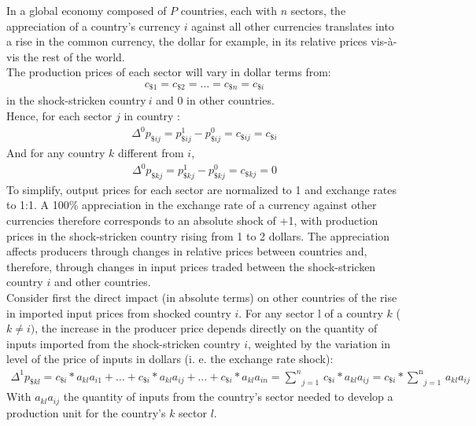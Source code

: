 \documentclass[11pt,a4paper]{article}
\begin{document}
In a global economy composed of $P$ countries, each with $n$ sectors, the appreciation of a country's currency $i$ against all other currencies translates into a rise in the common currency, the dollar for example, in its relative prices vis-\`a-vis the rest of the world. \\ 
The production prices of each sector will vary in dollar terms from:
\begin{eqnarray*}
c_{\$1}=c_{\$2}=\ldots=c_{\$n}=c_{\$i} 
  \end{eqnarray*}	
in the shock-stricken country$~i$ and 0 in other countries. \\
Hence, for each sector $j$ in country  :
\begin{eqnarray*}
 {{\Delta }^{0}}p_{\${ij}}=p_{\${ij}}^{1}-p_{\${ij}}^{0}=c_{\${ij}}=c_{\${i}}
  \end{eqnarray*}	
And for any country $k$ different from $i$,
\begin{eqnarray*}
 {{\Delta }^{0}}p_{\${kj}}=p_{\${kj}}^{1}-p_{\${kj}}^{0}=c_{\${kj}}=0
 \end{eqnarray*}	
To simplify, output prices for each sector are normalized to 1 and exchange rates to 1:1. A 100$\%$ appreciation in the exchange rate of a currency against other currencies therefore corresponds to an absolute shock of +1, with production prices in the shock-stricken country rising from 1 to 2 dollars. The appreciation affects producers through changes in relative prices between countries and, therefore, through changes in input prices traded between the shock-stricken country $i$ and other countries. \\
Consider first the direct impact (in absolute terms) on other countries of the rise in imported input prices from shocked country $i$. For any sector l of a country $k$ ($k\ne i)$, the increase in the producer price depends directly on the quantity of inputs imported from the shock-stricken country $i$, weighted by the variation in level of the price of inputs in dollars (i. e. the exchange rate shock):\\
\begin{eqnarray*}
\Delta ^1 p_{\${kl}}=c_{\${i}}*a_{kl}a_{i1}+\ldots+c_{\${i}}*a_{kl}a_{ij}+\ldots+c_{\$i}*a_{kl}a_{in}=\underset{j=1}{\overset{n}{\mathop\sum}}\,{c}_{\$i}*a_{kl}a_{ij}=c_{\$i}*\underset{j=1}{\overset{\text{n}}{\mathop\sum}}\,a_{kl}a_{ij}   
\end{eqnarray*}
With $a_{kl}a_{ij}$ the quantity of inputs from the country's sector needed to develop a production unit for the country's $k$ sector $l$. \\
\end{document}
